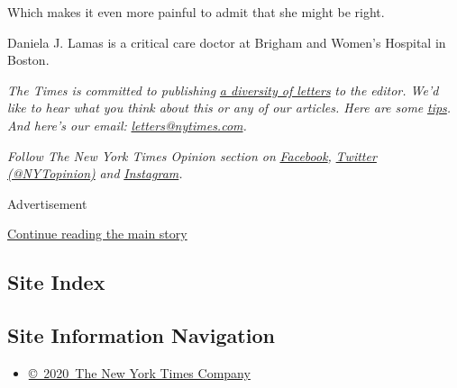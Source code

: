 Which makes it even more painful to admit that she might be right.

Daniela J. Lamas is a critical care doctor at Brigham and Women's
Hospital in Boston.

\emph{The Times is committed to publishing}
\href{https://www.nytimes.com/2019/01/31/opinion/letters/letters-to-editor-new-york-times-women.html}{\emph{a
diversity of letters}} \emph{to the editor. We'd like to hear what you
think about this or any of our articles. Here are some}
\href{https://help.nytimes.com/hc/en-us/articles/115014925288-How-to-submit-a-letter-to-the-editor}{\emph{tips}}\emph{.
And here's our email:}
\href{mailto:letters@nytimes.com}{\emph{letters@nytimes.com}}\emph{.}

\emph{Follow The New York Times Opinion section on}
\href{https://www.facebook.com/nytopinion}{\emph{Facebook}}\emph{,}
\href{http://twitter.com/NYTOpinion}{\emph{Twitter (@NYTopinion)}}
\emph{and}
\href{https://www.instagram.com/nytopinion/}{\emph{Instagram}}\emph{.}

Advertisement

\protect\hyperlink{after-bottom}{Continue reading the main story}

\hypertarget{site-index}{%
\subsection{Site Index}\label{site-index}}

\hypertarget{site-information-navigation}{%
\subsection{Site Information
Navigation}\label{site-information-navigation}}

\begin{itemize}
\tightlist
\item
  \href{https://help.nytimes.com/hc/en-us/articles/115014792127-Copyright-notice}{©~2020~The
  New York Times Company}
\end{itemize}

